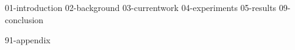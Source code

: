 \documentclass[a4paper,oneside,10pt,ngerman,english]{scrbook}
\begin{document}

\mainmatter


{01-introduction}
{02-background}
{03-currentwork}
{04-experiments}
{05-results}
{09-conclusion}


\cleardoubleoddpage
\printbibliography

\cleardoubleoddpage
\listoffigures

\cleardoubleoddpage
\listoftables


\appendix


{91-appendix}


\cleardoubleoddpage
\end{document}
